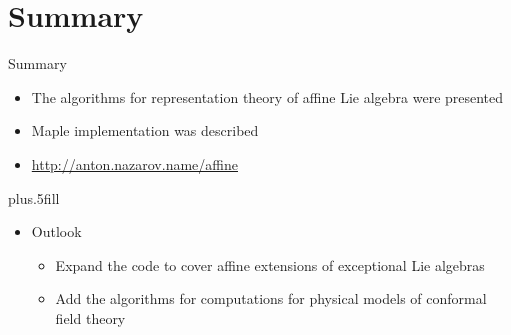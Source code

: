 \documentclass{beamer}
\theoremstyle{definition} \newtheorem{Def}{Definition}
\begin{document}
\section{Summary}
\label{sec:summary}
\begin{frame}{Summary}
  \begin{itemize}
  \item The algorithms for representation theory of affine Lie algebra were presented
  \item Maple implementation was described
  \item \url{http://anton.nazarov.name/affine}
  \end{itemize}
  \vskip0pt plus.5fill
  \begin{itemize}
  \item
    Outlook
    \begin{itemize}
    \item
      Expand the code to cover affine extensions of exceptional Lie algebras
    \item
      Add the algorithms for computations for physical models of conformal field theory
    \end{itemize}
  \end{itemize}
\end{frame}

{}

\end{document}
